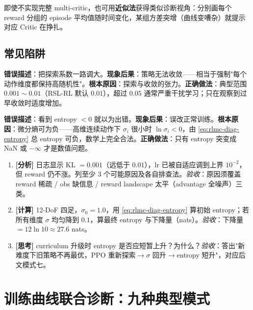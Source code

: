 即使不实现完整 multi-critic，也可用\textbf{近似法}获得类似诊断视角：分别画每个 reward 分组的 episode 平均值随时间变化，某组方差突增（曲线变嘈杂）就提示对应 Critic 在挣扎。

\subsection{常见陷阱}

\begin{pitfall}
\textbf{错误描述}：把探索系数一路调大。\textbf{现象后果}：策略无法收敛——相当于强制"每个动作维度都保持高随机性"。\textbf{根本原因}：探索与收敛的张力。\textbf{正确做法}：典型范围 $0.001\sim0.01$（RSL-RL 默认 $0.01$），超过 $0.05$ 通常严重干扰学习；只在观察到过早收敛时适度增加。
\end{pitfall}

\begin{pitfall}
\textbf{错误描述}：看到 entropy $<0$ 就以为出错。\textbf{现象后果}：误改正常训练。\textbf{根本原因}：微分熵可为负——高维连续动作下 $\sigma_i$ 很小时 $\ln\sigma_i<0$，由 \eqref{eq:rlmc-diag-entropy} 总 entropy 可负，数学上完全合法。\textbf{正确做法}：只有 entropy 突变成 NaN 或 $-\infty$ 才是数值问题。
\end{pitfall}

\begin{practice}[本节动手任务]
\begin{enumerate}
  \item \textbf{[分析]} 日志显示 KL $=0.001$（远低于 $0.01$），lr 已被自适应调到上界 $10^{-2}$，但 reward 仍不涨。列至少 3 个可能原因及各自排查法。\emph{验收}：原因须覆盖 reward 稀疏 / obs 缺信息 / reward landscape 太平（advantage 全噪声）三类。
  \item \textbf{[计算]} 12-DoF 四足，$\sigma_0=1.0$，用 \eqref{eq:rlmc-diag-entropy} 算初始 entropy；若所有维度 $\sigma$ 均匀降到 $0.1$，算最终 entropy 与下降量（nats）。\emph{验收}：下降量 $=12\ln 10 \approx 27.6$ nats。
  \item \textbf{[思考]} curriculum 升级时 entropy 是否应短暂上升？为什么？\emph{验收}：答出"新难度下旧策略不再最优，PPO 重新探索$\to$$\sigma$ 回升$\to$entropy 短升"，对应后文模式七。
\end{enumerate}
\end{practice}

\section{训练曲线联合诊断：九种典型模式}
\label{sec:rlmc-diag-patterns}


